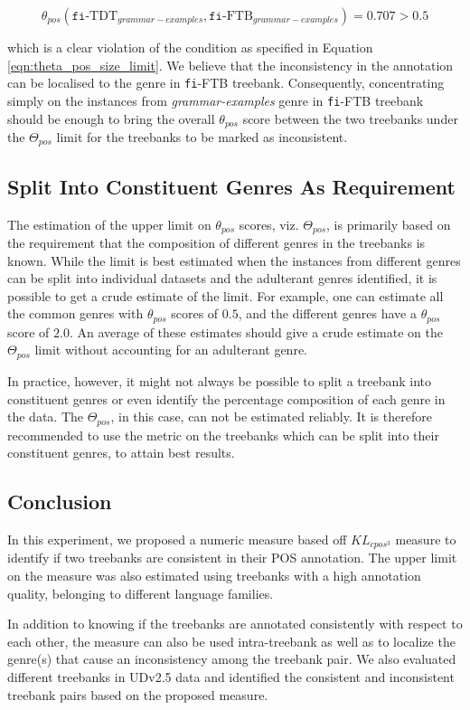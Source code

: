 \begin{equation*}
    \theta_{pos}(\texttt{fi}\text{-TDT}_{grammar-examples}, \texttt{fi}\text{-FTB}_{grammar-examples}) = 0.707 > 0.5
\end{equation*}

which is a clear violation of the condition as specified in Equation \ref{eqn:theta_pos_size_limit}. We believe that the inconsistency in the annotation can be localised to the genre in \texttt{fi}-FTB treebank. Consequently, concentrating simply on the instances from \textit{grammar-examples} genre in \texttt{fi}-FTB treebank should be enough to bring the overall $\theta_{pos}$ score between the two treebanks under the $\Theta_{pos}$ limit for the treebanks to be marked as inconsistent.

\subsection{Split Into Constituent Genres As Requirement}

The estimation of the upper limit on $\theta_{pos}$ scores, viz. $\Theta_{pos}$, is primarily based on the requirement that the composition of different genres in the treebanks is known. While the limit is best estimated when the instances from different genres can be split into individual datasets and the adulterant genres identified, it is possible to get a crude estimate of the limit. For example, one can estimate all the common genres with $\theta_{pos}$ scores of $0.5$, and the different genres have a $\theta_{pos}$ score of $2.0$. An average of these estimates should give a crude estimate on the $\Theta_{pos}$ limit without accounting for an adulterant genre.

In practice, however, it might not always be possible to split a treebank into constituent genres or even identify the percentage composition of each genre in the data. The $\Theta_{pos}$, in this case, can not be estimated reliably. It is therefore recommended to use the metric on the treebanks which can be split into their constituent genres, to attain best results.

\subsection{Conclusion}

In this experiment, we proposed a numeric measure based off $KL_{cpos^{3}}$ measure \citep{klcpos3} to identify if two treebanks are consistent in their POS annotation. The upper limit on the measure was also estimated using treebanks with a high annotation quality, belonging to different language families.

In addition to knowing if the treebanks are annotated consistently with respect to each other, the measure can also be used intra-treebank as well as to localize the genre(s) that cause an inconsistency among the treebank pair. We also evaluated different treebanks in UDv2.5 data \citep{UDv2.5} and identified the consistent and inconsistent treebank pairs based on the proposed measure.